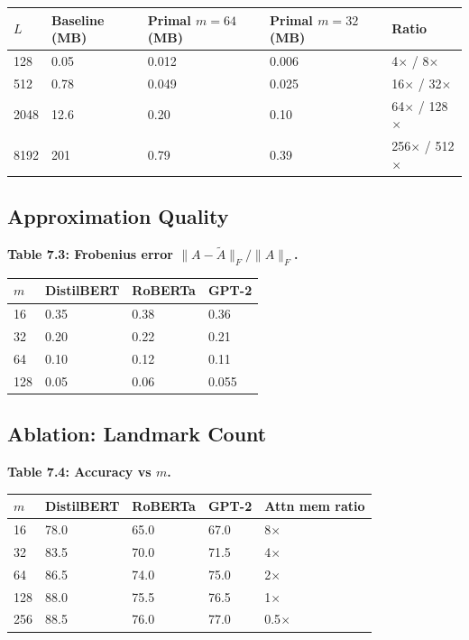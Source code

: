 \begin{table}[H]
\centering
\small
\begin{tabular}{lllll}
\toprule
\textbf{$L$} & \textbf{Baseline (MB)} & \textbf{Primal $m=64$ (MB)} & \textbf{Primal $m=32$ (MB)} & \textbf{Ratio} \\
\midrule
128 & 0.05 & 0.012 & 0.006 & 4$\times$ / 8$\times$ \\
512 & 0.78 & 0.049 & 0.025 & 16$\times$ / 32$\times$ \\
2048 & 12.6 & 0.20 & 0.10 & 64$\times$ / 128$\times$ \\
8192 & 201 & 0.79 & 0.39 & 256$\times$ / 512$\times$ \\
\bottomrule
\end{tabular}
\end{table}

\subsection{Approximation Quality}

\textbf{Table 7.3: Frobenius error $\|A - \tilde{A}\|_F / \|A\|_F$.}

\begin{table}[H]
\centering
\small
\begin{tabular}{llll}
\toprule
\textbf{$m$} & \textbf{DistilBERT} & \textbf{RoBERTa} & \textbf{GPT-2} \\
\midrule
16 & 0.35 & 0.38 & 0.36 \\
32 & 0.20 & 0.22 & 0.21 \\
64 & 0.10 & 0.12 & 0.11 \\
128 & 0.05 & 0.06 & 0.055 \\
\bottomrule
\end{tabular}
\end{table}

\subsection{Ablation: Landmark Count}

\textbf{Table 7.4: Accuracy vs $m$.}

\begin{table}[H]
\centering
\small
\begin{tabular}{lllll}
\toprule
\textbf{$m$} & \textbf{DistilBERT} & \textbf{RoBERTa} & \textbf{GPT-2} & \textbf{Attn mem ratio} \\
\midrule
16 & 78.0 & 65.0 & 67.0 & 8$\times$ \\
32 & 83.5 & 70.0 & 71.5 & 4$\times$ \\
64 & 86.5 & 74.0 & 75.0 & 2$\times$ \\
128 & 88.0 & 75.5 & 76.5 & 1$\times$ \\
256 & 88.5 & 76.0 & 77.0 & 0.5$\times$ \\
\bottomrule
\end{tabular}
\end{table}

